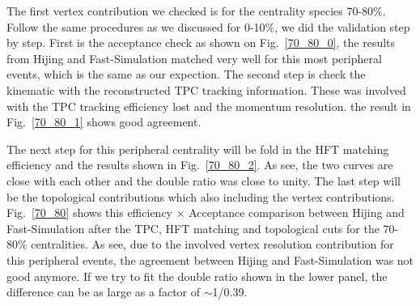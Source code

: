 The first vertex contribution we checked is for the centrality species 70-80\%. Follow the same procedures as we discussed for 0-10\%, we did the validation step by step. First is the acceptance check as shown on Fig.~\ref{70_80_0}, the results from Hijing and Fast-Simulation matched very well for this most peripheral events, which is the same as our expection. The second step is check the kinematic with the reconstructed TPC tracking information. These was involved with the TPC tracking efficiency lost and the momentum resolution. the result in Fig.~\ref{70_80_1} shows good agreement.

The next step for this peripheral centrality will be fold in the HFT matching efficiency and the results shown in Fig.~\ref{70_80_2}. As see, the two curves are close with each other and the double ratio was close to unity. The last step will be the topological contributions which also including the vertex contributions. Fig.~\ref{70_80} shows this efficiency $\times$ Acceptance comparison between Hijing and Fast-Simulation after the TPC, HFT matching and topological cuts for the 70-80\% centralities. As see, due to the involved vertex resolution contribution for this peripheral events, the agreement between Hijing and Fast-Simulation was not good anymore. If we try to fit the double ratio shown in the lower panel, the difference can be as large as a factor of $\sim$1/0.39.


